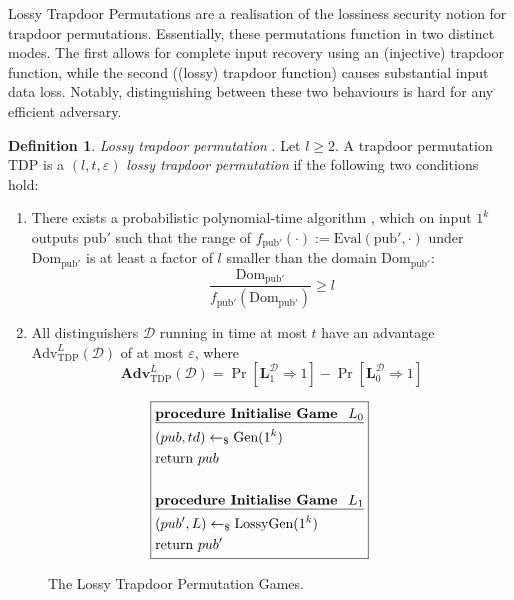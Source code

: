 \documentclass[]{final_report}
\theoremstyle{definition}
\newtheorem{definition}{Definition}[chapter]
\begin{document}
Lossy Trapdoor Permutations are a realisation of the lossiness security notion for trapdoor permutations. Essentially, these permutations function in two distinct modes. The first allows for complete input recovery using an (injective) trapdoor function, while the second ((lossy) trapdoor function) causes substantial input data loss. Notably, distinguishing between these two behaviours is hard for any efficient adversary.

\begin{definition}
\textit{Lossy trapdoor permutation} \cite{10.1145/1374376.1374406, kakvi2018optimal}. Let \( l \geq 2 \). A trapdoor permutation \( \text{TDP} \) is a \( (l, t, \varepsilon) \) \textit{lossy trapdoor permutation} if the following two conditions hold:

\begin{enumerate}
    \item There exists a probabilistic polynomial-time algorithm , which on input \( 1^k \) outputs \( \text{pub}' \) such that the range of \( f_{\text{pub}'}(\cdot) := \text{Eval}(\text{pub}', \cdot) \) under \( \text{Dom}_{\text{pub}'} \) is at least a factor of \( l \) smaller than the domain \( \text{Dom}_{\text{pub}'} \): 
    \[ \frac{\text{Dom}_{\text{pub}'}}{f_{\text{pub}'}(\text{Dom}_{\text{pub}'})} \geq l \]
    
    \item All distinguishers \( \mathcal{D} \) running in time at most \( t \) have an advantage \( \text{Adv}^L_{\text{TDP}}(\mathcal{D}) \) of at most \( \varepsilon \), where
    \[ \textbf{Adv}^L_{\text{TDP}}(\mathcal{D}) = \Pr[\textbf{L}_{1}^{\mathcal{D}}  \Rightarrow 1] - \Pr[\textbf{L}_{0}^{\mathcal{D}} \Rightarrow 1] \]
\end{enumerate}
\end{definition}

\begin{figure}[H]
\[
\boxed{
\begin{aligned}
&\underline{\textbf{\text{procedure Initialise Game } \(L_0\)}} \\
&(pub, td) \leftarrow_\$ \text{Gen}(1^k) \\
&\text{return } pub \\
\\
&\underline{\textbf{\text{procedure Initialise Game } \(L_1\)}} \\
&(pub', L) \leftarrow_\$ \text{LossyGen}(1^k) \\
&\text{return } pub' \\
\end{aligned}
}
\]
\caption{The Lossy Trapdoor Permutation Games.}
\label{fig:lossy_trapdoor_permutation_games}
\end{figure}
\end{document}
